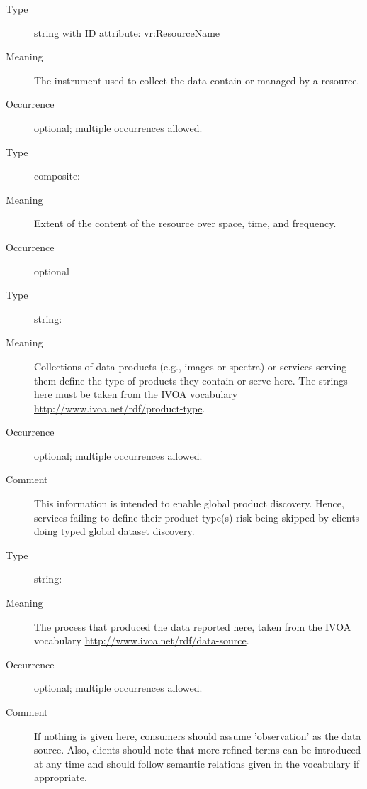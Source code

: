 \documentclass[11pt,a4paper]{ivoa}
\begin{document}
\begin{generated}
\begin{bigdescription}
\begin{description}
\end{description}
\item[Element \xmlel{instrument}]
\begin{description}
\item[Type] string with ID attribute: vr:ResourceName
\item[Meaning] The instrument used to collect the data contain or
                     managed by a resource.
\item[Occurrence] optional; multiple occurrences allowed.

\end{description}
\item[Element \xmlel{coverage}]
\begin{description}
\item[Type] composite: 
\item[Meaning] Extent of the content of the resource over space, time,
                     and frequency.
\item[Occurrence] optional

\end{description}
\item[Element \xmlel{productTypeServed}]
\begin{description}
\item[Type] string: 
\item[Meaning] Collections of data products (e.g., images or spectra)
	              		or services serving them define the type of products
	              		they contain or serve here.  The strings here must
	              		be taken from the IVOA vocabulary
	              		\url{http://www.ivoa.net/rdf/product-type}.
\item[Occurrence] optional; multiple occurrences allowed.
\item[Comment] This information is intended
	              		to enable global product discovery.  Hence, services
	              		failing to define their product type(s) risk being skipped
	              		by clients doing typed global dataset discovery.

\end{description}
\item[Element \xmlel{dataSource}]
\begin{description}
\item[Type] string: 
\item[Meaning] The process that produced the data reported here,
	              		taken from the IVOA vocabulary
	              		\url{http://www.ivoa.net/rdf/data-source}.
\item[Occurrence] optional; multiple occurrences allowed.
\item[Comment] If nothing is given here, consumers should assume
	              	   'observation' as the data source.  Also, clients
	              	   should note that more refined terms can be introduced
	              	   at any time and should follow semantic relations
	              	   given in the vocabulary if appropriate.


\end{description}
\end{bigdescription}
\end{generated}
\end{document}
